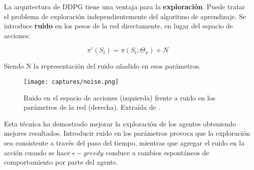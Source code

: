 \documentclass[11pt,fleqn]{book} %
\begin{document}
La arquitectura de DDPG tiene una ventaja para la \textbf{exploración}. Puede tratar el problema de exploración independientemente del algoritmo de aprendizaje. Se introduce \textbf{ruido} en los pesos de la red directamente, en lugar del espacio de acciones:

\begin{equation}
\pi'(S_t)=\pi(S_t;\Theta_\pi)+N
\end{equation}

Siendo N la representación del ruido añadido en esos parámetros.\\

\begin{figure}[H]
	\centering\texttt{[image: captures/noise.png]}
	\caption{Ruido en el espacio de acciones (izquierda) frente a ruido en los parámetros de la red (derecha). Extraída de \cite{article:DDPG_2}.}
	\label{fig:noise} %
\end{figure}

Esta técnica ha demostrado mejorar la exploración de los agentes obteniendo mejores resultados. Introducir ruido en los parámetros provoca que la exploración sea consistente a través del paso del tiempo, mientras que agregar el ruido en la acción cuando se hace $\epsilon-greedy$ conduce a cambios espontáneos de comportamiento por parte del agente. \\

%
%	
%	
%
%
\end{document}
